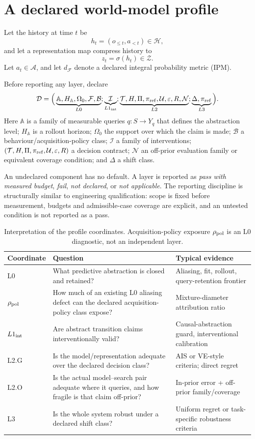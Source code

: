 \documentclass[10pt]{article}
\newcommand{\Aabs}{\mathbb A}
\begin{document}
\section{A declared world-model profile}

Let the history at time $t$ be
\[
h_t=(o_{\le t},a_{<t})\in\mathcal H,
\]
and let a representation map compress history to
\[
z_t=\sigma(h_t)\in\mathcal Z.
\]
Let $a_t\in\mathcal A$, and let $d_{\mathcal F}$ denote a declared integral probability metric (IPM).

Before reporting any layer, declare
\[
\mathcal D=
\Big(
\underbrace{\Aabs,H_{\Aabs},\Omega_0,\mathcal F,\mathcal B}_{L0};
\underbrace{\mathcal I}_{L1_{\rm int}};
\underbrace{\mathcal T,H,\Pi,\pi_{\rm ref},\mathcal U,\varepsilon,R,\mathcal N}_{L2};
\underbrace{\Delta,\pi_{\rm ref}}_{L3}
\Big).
\]
Here $\Aabs$ is a family of measurable queries $q:S\to Y_q$ that defines the abstraction level; $H_{\Aabs}$ is a rollout horizon; $\Omega_0$ the support over which the claim is made; $\mathcal B$ a behaviour/acquisition-policy class; $\mathcal I$ a family of interventions; $(\mathcal T,H,\Pi,\pi_{\rm ref},\mathcal U,\varepsilon,R)$ a decision contract; $\mathcal N$ an off-prior evaluation family or equivalent coverage condition; and $\Delta$ a shift class.

An undeclared component has no default. A layer is reported as \emph{pass with measured budget}, \emph{fail}, \emph{not declared}, or \emph{not applicable}. The reporting discipline is structurally similar to engineering qualification: scope is fixed before measurement, budgets and admissible-case coverage are explicit, and an untested condition is not reported as a pass.

\begin{table}[t]
\centering
\caption{Interpretation of the profile coordinates. Acquisition-policy exposure $\rho_{\rm pol}$ is an L0 diagnostic, not an independent layer.}
\begin{tabularx}{\linewidth}{@{}lX X@{}}
\toprule
Coordinate & Question & Typical evidence \\
\midrule
L0 & What predictive abstraction is closed and retained? & Aliasing, fit, rollout, query-retention frontier \\
$\rho_{\rm pol}$ & How much of an existing L0 aliasing defect can the declared acquisition-policy class expose? & Mixture-diameter attribution ratio \\
$L1_{\rm int}$ & Are abstract transition claims interventionally valid? & Causal-abstraction guard, interventional calibration \\
L2.G & Is the model/representation adequate over the declared decision class? & AIS or VE-style criteria; direct regret \\
L2.O & Is the actual model--search pair adequate where it queries, and how fragile is that claim off-prior? & In-prior error + off-prior family/coverage \\
L3 & Is the whole system robust under a declared shift class? & Uniform regret or task-specific robustness criteria \\
\bottomrule
\end{tabularx}
\end{table}
\end{document}

